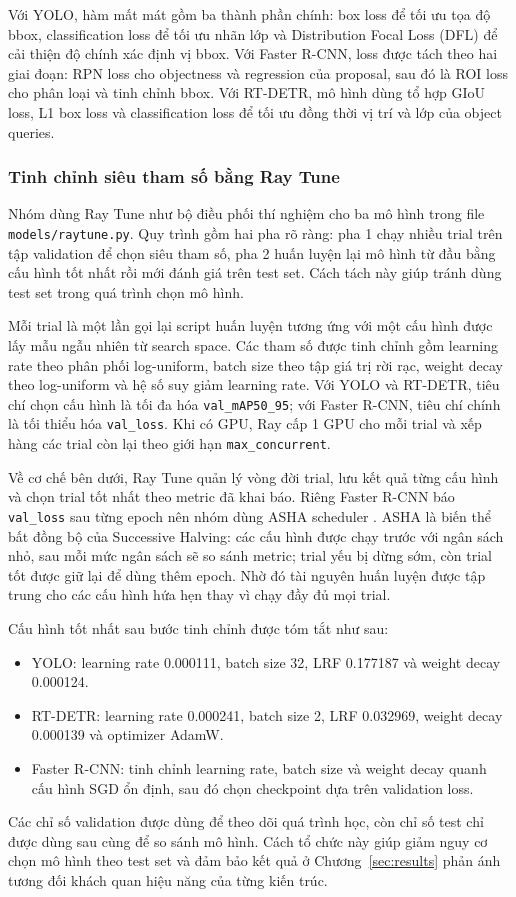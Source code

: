 Với YOLO, hàm mất mát gồm ba thành phần chính: box loss để tối ưu tọa độ bbox, classification loss để tối ưu nhãn lớp và Distribution Focal Loss (DFL) để cải thiện độ chính xác định vị bbox. Với Faster R-CNN, loss được tách theo hai giai đoạn: RPN loss cho objectness và regression của proposal, sau đó là ROI loss cho phân loại và tinh chỉnh bbox. Với RT-DETR, mô hình dùng tổ hợp GIoU loss, L1 box loss và classification loss để tối ưu đồng thời vị trí và lớp của object queries.

\subsubsection{Tinh chỉnh siêu tham số bằng Ray Tune}

Nhóm dùng Ray Tune \cite{moritz2018ray} như bộ điều phối thí nghiệm cho ba mô hình trong file \texttt{models/raytune.py}. Quy trình gồm hai pha rõ ràng: pha 1 chạy nhiều trial trên tập validation để chọn siêu tham số, pha 2 huấn luyện lại mô hình từ đầu bằng cấu hình tốt nhất rồi mới đánh giá trên test set. Cách tách này giúp tránh dùng test set trong quá trình chọn mô hình.

Mỗi trial là một lần gọi lại script huấn luyện tương ứng với một cấu hình được lấy mẫu ngẫu nhiên từ search space. Các tham số được tinh chỉnh gồm learning rate theo phân phối log-uniform, batch size theo tập giá trị rời rạc, weight decay theo log-uniform và hệ số suy giảm learning rate. Với YOLO và RT-DETR, tiêu chí chọn cấu hình là tối đa hóa \texttt{val\_mAP50\_95}; với Faster R-CNN, tiêu chí chính là tối thiểu hóa \texttt{val\_loss}. Khi có GPU, Ray cấp 1 GPU cho mỗi trial và xếp hàng các trial còn lại theo giới hạn \texttt{max\_concurrent}.

Về cơ chế bên dưới, Ray Tune quản lý vòng đời trial, lưu kết quả từng cấu hình và chọn trial tốt nhất theo metric đã khai báo. Riêng Faster R-CNN báo \texttt{val\_loss} sau từng epoch nên nhóm dùng ASHA scheduler \cite{li2020asha}. ASHA là biến thể bất đồng bộ của Successive Halving: các cấu hình được chạy trước với ngân sách nhỏ, sau mỗi mức ngân sách sẽ so sánh metric; trial yếu bị dừng sớm, còn trial tốt được giữ lại để dùng thêm epoch. Nhờ đó tài nguyên huấn luyện được tập trung cho các cấu hình hứa hẹn thay vì chạy đầy đủ mọi trial.

Cấu hình tốt nhất sau bước tinh chỉnh được tóm tắt như sau:

\begin{itemize}
    \item YOLO: learning rate 0.000111, batch size 32, LRF 0.177187 và weight decay 0.000124.
    \item RT-DETR: learning rate 0.000241, batch size 2, LRF 0.032969, weight decay 0.000139 và optimizer AdamW.
    \item Faster R-CNN: tinh chỉnh learning rate, batch size và weight decay quanh cấu hình SGD ổn định, sau đó chọn checkpoint dựa trên validation loss.
\end{itemize}

Các chỉ số validation được dùng để theo dõi quá trình học, còn chỉ số test chỉ được dùng sau cùng để so sánh mô hình. Cách tổ chức này giúp giảm nguy cơ chọn mô hình theo test set và đảm bảo kết quả ở Chương~\ref{sec:results} phản ánh tương đối khách quan hiệu năng của từng kiến trúc.
